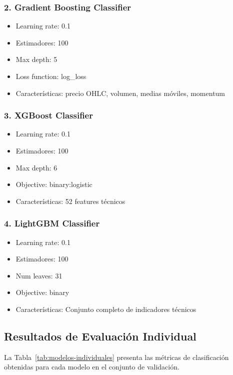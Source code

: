 \documentclass[12pt,a4paper]{report}
\begin{document}
\subsubsection*{2. Gradient Boosting Classifier}
\begin{itemize}
    \item Learning rate: 0.1
    \item Estimadores: 100
    \item Max depth: 5
    \item Loss function: log\_loss
    \item Características: precio OHLC, volumen, medias móviles, momentum
\end{itemize}

\subsubsection*{3. XGBoost Classifier}
\begin{itemize}
    \item Learning rate: 0.1
    \item Estimadores: 100
    \item Max depth: 6
    \item Objective: binary:logistic
    \item Características: 52 features técnicos
\end{itemize}

\subsubsection*{4. LightGBM Classifier}
\begin{itemize}
    \item Learning rate: 0.1
    \item Estimadores: 100
    \item Num leaves: 31
    \item Objective: binary
    \item Características: Conjunto completo de indicadores técnicos
\end{itemize}

\subsection{Resultados de Evaluación Individual}

La Tabla~\ref{tab:modelos-individuales} presenta las métricas de clasificación obtenidas para cada modelo en el conjunto de validación.
\end{document}

